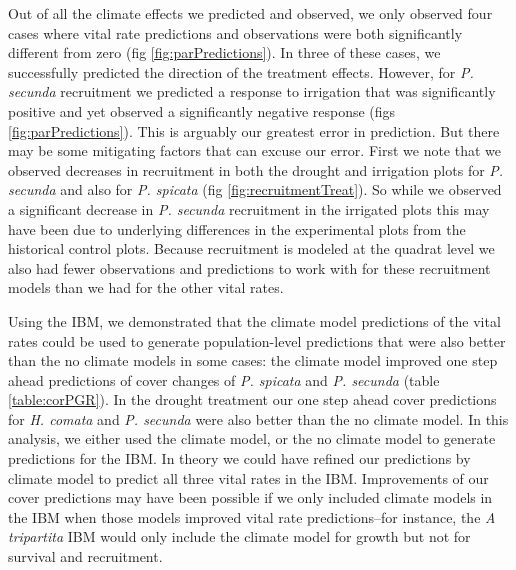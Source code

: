\documentclass[11pt]{article}
\begin{document}
\begin{doublespacing}
Out of all the climate effects we predicted and observed, we only observed four cases where vital rate predictions and observations were both significantly different from zero (fig  \ref{fig:parPredictions}). In three of these cases, we successfully predicted the direction of the treatment effects. However, for \textit{P. secunda} recruitment we predicted a response to irrigation that was significantly positive and yet observed a significantly negative response (figs \ref{fig:parPredictions}). This is arguably our greatest error in prediction. But there may be some mitigating factors that can excuse our error. First we note that we observed decreases in recruitment in both the drought and irrigation plots for \textit{P. secunda} and also for \textit{P. spicata} (fig \ref{fig:recruitmentTreat}). So while we observed a significant decrease in \textit{P. secunda} recruitment in the irrigated plots this may have been due to underlying differences in the experimental plots from the historical control plots. Because recruitment is modeled at the quadrat level we also had fewer observations and predictions to work with for these recruitment models than we had for the other vital rates.    

Using the IBM, we demonstrated that the climate model predictions of the vital rates could be used to generate population-level predictions that were also better than the no climate models in some cases: the climate model improved one step ahead predictions of cover changes of \textit{P. spicata} and \textit{P. secunda} (table \ref{table:corPGR}). In the drought treatment our one step ahead cover predictions for \textit{H. comata} and \textit{P. secunda} were also better than the no climate model. In this analysis, we either used the climate model, or the no climate model to generate predictions for the IBM. In theory we could have refined our predictions by  climate model to predict all three vital rates in the IBM. Improvements of our cover predictions may have been possible if we only included climate models in the IBM when those models improved vital rate predictions--for instance, the \textit{A tripartita} IBM would only include the climate model for growth but not for survival and recruitment.   


\end{doublespacing}
\end{document}

